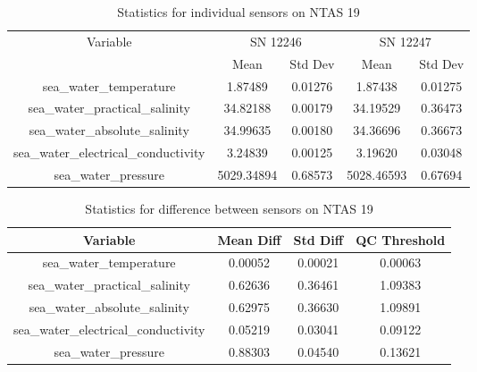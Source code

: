 \begin{table}[h]
\centering
\begin{tabular}{|c|c|c|c|c|}
\hline
Variable & \multicolumn{2}{c|}{SN 12246} & \multicolumn{2}{c|}{SN 12247} \\
& Mean & Std Dev & Mean & Std Dev \\
\hline
sea\_water\_temperature & 1.87489 & 0.01276 & 1.87438 & 0.01275 \\
sea\_water\_practical\_salinity & 34.82188 & 0.00179 & 34.19529 & 0.36473 \\
sea\_water\_absolute\_salinity & 34.99635 & 0.00180 & 34.36696 & 0.36673 \\
sea\_water\_electrical\_conductivity & 3.24839 & 0.00125 & 3.19620 & 0.03048 \\
sea\_water\_pressure & 5029.34894 & 0.68573 & 5028.46593 & 0.67694 \\
\hline
\end{tabular}
\caption{Statistics for individual sensors on NTAS 19}
\end{table}

\begin{table}[h]
\centering
\begin{tabular}{|c|c|c|c|}
\hline
Variable & Mean Diff & Std Diff & QC Threshold \\
\hline
sea\_water\_temperature & 0.00052 & 0.00021 & 0.00063 \\
sea\_water\_practical\_salinity & 0.62636 & 0.36461 & 1.09383 \\
sea\_water\_absolute\_salinity & 0.62975 & 0.36630 & 1.09891 \\
sea\_water\_electrical\_conductivity & 0.05219 & 0.03041 & 0.09122 \\
sea\_water\_pressure & 0.88303 & 0.04540 & 0.13621 \\
\hline
\end{tabular}
\caption{Statistics for difference between sensors on NTAS 19}
\end{table}
